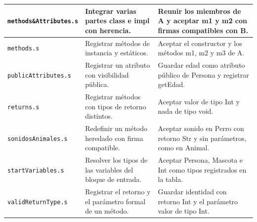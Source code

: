 \begin{longtable}{|
>{\raggedright\arraybackslash}p{}|
>{\raggedright\arraybackslash}p{}|
>{\raggedright\arraybackslash}p{}|}
\texttt{methods\&Attributes\allowbreak .s} & Integrar varias partes class e impl con herencia. & Reunir los miembros de A y aceptar m1 y m2 con firmas compatibles con B. \\ \hline
\texttt{methods\allowbreak .s} & Registrar métodos de instancia y estáticos. & Aceptar el constructor y los métodos m1, m2 y m3 de A. \\ \hline
\texttt{publicAttributes\allowbreak .s} & Registrar un atributo con visibilidad pública. & Guardar edad como atributo público de Persona y registrar getEdad. \\ \hline
\texttt{returns\allowbreak .s} & Registrar métodos con tipos de retorno distintos. & Aceptar valor de tipo Int y nada de tipo void. \\ \hline
\texttt{sonidosAnimales\allowbreak .s} & Redefinir un método heredado con firma compatible. & Aceptar sonido en Perro con retorno Str y sin parámetros, como en Animal. \\ \hline
\texttt{startVariables\allowbreak .s} & Resolver los tipos de las variables del bloque de entrada. & Aceptar Persona, Mascota e Int como tipos registrados en la tabla. \\ \hline
\texttt{validReturnType\allowbreak .s} & Registrar el retorno y el parámetro formal de un método. & Guardar identidad con retorno Int y el parámetro valor de tipo Int. \\ \hline
\end{longtable}
\endgroup
